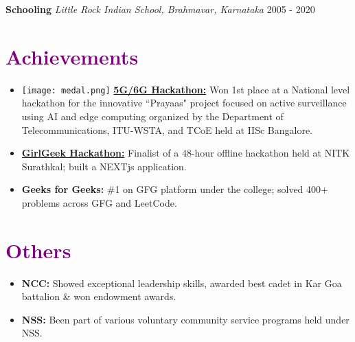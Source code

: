 \documentclass[a4paper,10pt]{article}
\begin{document}
\textbf{Schooling} \hfill \textit{Little Rock Indian School, Brahmavar, Karnataka} \hfill 2005 - 2020

\section*{\textcolor{purple}{Achievements}}
\begin{itemize}[leftmargin=*]
    \item \texttt{[image: medal.png]} \textbf{\href{https://drive.google.com/file/d/1JJJOSDJo7iRQWddNr2prz9Vt2a4Tx32u/view?usp=drive_link}{5G/6G Hackathon:}} Won 1st place at a National level hackathon for the innovative “Prayaas" project focused on active surveillance using AI and edge computing organized by the Department of Telecommunications, ITU-WSTA, and TCoE held at IISc Bangalore.
    \item \textbf{\href{https://drive.google.com/file/d/1JPO2yJrg1egMq3m5Sc4XmHfafT3Q0Xx9/view?usp=drive_link}{GirlGeek Hackathon:}} Finalist of a 48-hour offline hackathon held at NITK Surathkal; built a NEXTjs application.
    \item \textbf{Geeks for Geeks:} \#1 on GFG platform under the college; solved 400+ problems across GFG and LeetCode.
\end{itemize}

\section*{\textcolor{purple}{Others}}
\begin{itemize}[leftmargin=*]
    \item \textbf{NCC:} Showed exceptional leadership skills, awarded best cadet in Kar Goa battalion \& won endowment awards.
    \item \textbf{NSS:} Been part of various voluntary community service programs held under NSS.
\end{itemize}
\end{document}
